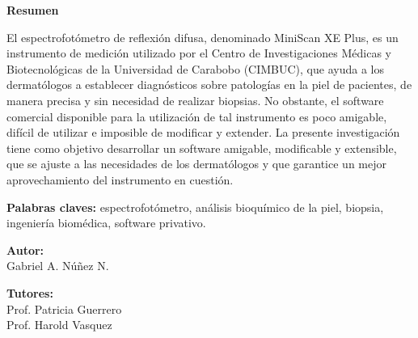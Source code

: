 
\begin{center}
	\membrete
	\vfill
	\titulo
	\vfill
	\textbf{Resumen}
\end{center}

	\noindent
El espectrofot\'{o}metro de reflexi\'{o}n difusa, denominado MiniScan XE Plus, es un instrumento de medici\'{o}n utilizado por el Centro de Investigaciones M\'{e}dicas y Biotecnol\'{o}gicas de la Universidad de Carabobo (CIMBUC), que ayuda a los dermat\'{o}logos a establecer diagn\'{o}sticos sobre patolog\'{i}as en la piel de pacientes, de manera precisa y sin necesidad de realizar biopsias. No obstante, el software comercial disponible para la utilizaci\'{o}n de tal instrumento es poco amigable, dif\'{i}cil de utilizar e imposible de modificar y extender. La presente investigaci\'{o}n tiene como objetivo desarrollar un software amigable, modificable y extensible, que se ajuste a las necesidades de los dermat\'{o}logos y que garantice un mejor aprovechamiento del instrumento en cuesti\'{o}n.

	\noindent
	\textbf{Palabras claves:} espectrofot\'{o}metro, an\'{a}lisis bioqu\'{i}mico de la piel, biopsia, ingenier\'{i}a biom\'{e}dica, software privativo.

\vfill
\begin{minipage}[t]{0.45\textwidth}
	\begin{flushleft}
		\begin{center}
			\textbf{Autor:} \\
			Gabriel A. N\'{u}\~{n}ez N.
		\end{center}
	\end{flushleft}
\end{minipage}
\begin{minipage}[t]{0.45\textwidth}
	\begin{flushright}
		\begin{center}
			\textbf{Tutores:} \\
			Prof. Patricia Guerrero \\
			Prof. Harold Vasquez
		\end{center}
	\end{flushright}
\end{minipage}
\vfill
\begin{center}
	\fecha
\end{center}
